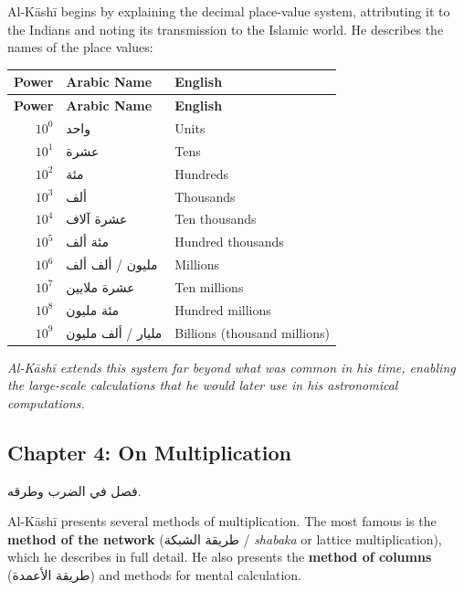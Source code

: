 \documentclass[11pt,a4paper]{article}
\newenvironment{arabicbox}{%
  \begin{framed}
  \begin{minipage}{\dimexpr\linewidth-2\fboxsep-2\fboxrule\relax}
  \setlength{\parindent}{0pt}
  \linespread{1.3}\selectfont
}{%
  \end{minipage}
  \end{framed}
}
\newcommand{\cnote}[1]{\textcolor{notecolor}{\textit{#1}}}
\newcommand{\ar}[1]{{\arabicfont\beginR #1\endR}}
\begin{document}
\vspace{0.3cm}

Al-K\=ash\=i begins by explaining the decimal place-value system, attributing
it to the Indians and noting its transmission to the Islamic world. He
describes the names of the place values:

\begin{longtable}{|r|l|l|}
\hline
\textbf{Power} & \textbf{Arabic Name} & \textbf{English} \\
\hline
\endfirsthead
\hline
\textbf{Power} & \textbf{Arabic Name} & \textbf{English} \\
\hline
\endhead
$10^0$ & \ar{واحد} & Units \\
\hline
$10^1$ & \ar{عشرة} & Tens \\
\hline
$10^2$ & \ar{مئة} & Hundreds \\
\hline
$10^3$ & \ar{ألف} & Thousands \\
\hline
$10^4$ & \ar{عشرة آلاف} & Ten thousands \\
\hline
$10^5$ & \ar{مئة ألف} & Hundred thousands \\
\hline
$10^6$ & \ar{مليون} / \ar{ألف ألف} & Millions \\
\hline
$10^7$ & \ar{عشرة ملايين} & Ten millions \\
\hline
$10^8$ & \ar{مئة مليون} & Hundred millions \\
\hline
$10^9$ & \ar{مليار} / \ar{ألف مليون} & Billions (thousand millions) \\
\hline
\end{longtable}

\cnote{Al-K\=ash\=i extends this system far beyond what was common in his
time, enabling the large-scale calculations that he would later use in
his astronomical computations.}

\subsection{Chapter 4: On Multiplication}

\begin{arabicbox}
\begin{Arabic}
فصل في الضرب وطرقه.
\end{Arabic}
\end{arabicbox}

\vspace{0.3cm}

Al-K\=ash\=i presents several methods of multiplication. The most famous is
the \textbf{method of the network} (\ar{طريقة الشبكة} /
\textit{shabaka} or lattice multiplication), which he describes in full
detail. He also presents the \textbf{method of columns}
(\ar{طريقة الأعمدة}) and methods for mental calculation.
\end{document}
